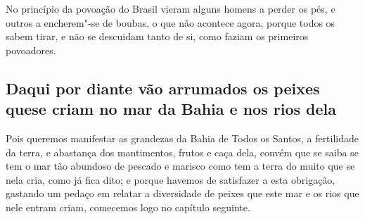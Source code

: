 \begin{linenumbers}
No princípio da povoação do Brasil vieram alguns homens a perder os pés, e outros a
encherem"-se de boubas, o que não acontece agora, porque todos os sabem tirar, e não se
descuidam tanto de si, como faziam os primeiros povoadores.

\subsection{Daqui por diante vão arrumados os peixes que\break se criam no mar da Bahia e nos
rios dela}

Pois queremos manifestar as grandezas da Bahia de Todos os Santos, a fertilidade da terra,
e abastança dos mantimentos, frutos e caça dela, convém que se saiba se tem o mar tão
abundoso de pescado e marisco como tem a terra do muito que se nela cria, como já fica
dito; e porque havemos de satisfazer a esta obrigação, gastando um pedaço em relatar a
diversidade de peixes que este mar e os rios que nele entram criam, comecemos logo no
capítulo seguinte.


\end{linenumbers}
